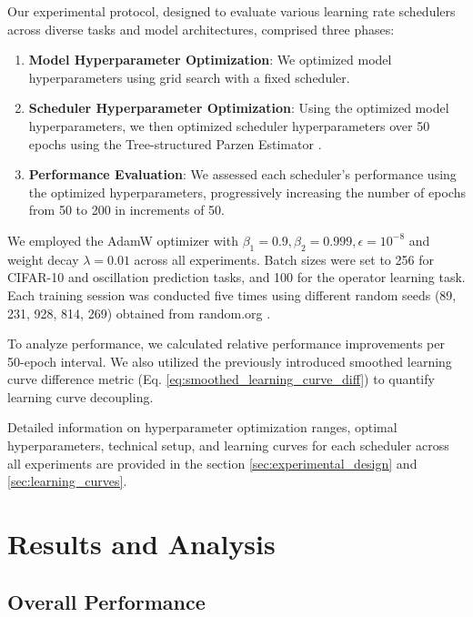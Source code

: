 \documentclass{article}
\theoremstyle{plain}
\theoremstyle{definition}
\theoremstyle{remark}
\begin{document}
Our experimental protocol, designed to evaluate various learning rate schedulers across diverse tasks and model architectures, comprised three phases:

\begin{enumerate}
   \item \textbf{Model Hyperparameter Optimization}: We optimized model hyperparameters using grid search with a fixed scheduler.
   \item \textbf{Scheduler Hyperparameter Optimization}: Using the optimized model hyperparameters, we then optimized scheduler hyperparameters over 50 epochs using the Tree-structured Parzen Estimator \cite{bergstra2011algorithms}.
   \item \textbf{Performance Evaluation}: We assessed each scheduler's performance using the optimized hyperparameters, progressively increasing the number of epochs from 50 to 200 in increments of 50.
\end{enumerate}

We employed the AdamW optimizer \cite{loshchilov2017decoupled} with $\beta_1 = 0.9, \beta_2 = 0.999, \epsilon=10^{-8}$ and weight decay $\lambda = 0.01$ across all experiments.
Batch sizes were set to 256 for CIFAR-10 and oscillation prediction tasks, and 100 for the operator learning task.
Each training session was conducted five times using different random seeds (89, 231, 928, 814, 269) obtained from random.org \cite{RandomOrg}.

To analyze performance, we calculated relative performance improvements per 50-epoch interval.
We also utilized the previously introduced smoothed learning curve difference metric (Eq. \ref{eq:smoothed_learning_curve_diff}) to quantify learning curve decoupling.

Detailed information on hyperparameter optimization ranges, optimal hyperparameters, technical setup, and learning curves for each scheduler across all experiments are provided in the section \ref{sec:experimental_design} and \ref{sec:learning_curves}.

\section{Results and Analysis}
\label{sec:results}

\subsection{Overall Performance}
\label{subsec:overall_performance}
\end{document}
